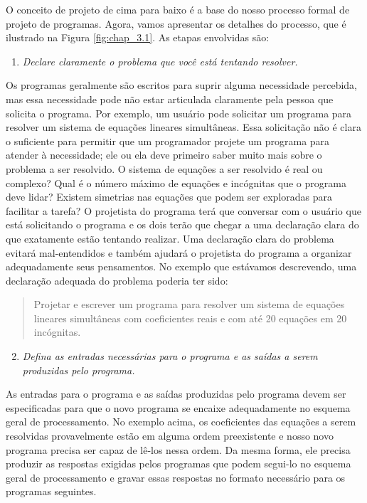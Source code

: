 \documentclass[11pt,a4paper]{book}
\begin{document}
	
	O conceito de projeto de cima para baixo é a base do nosso processo formal de projeto de programas. Agora, vamos apresentar os detalhes do processo, que é ilustrado na Figura \ref{fig:chap_3.1}. As etapas envolvidas são:
	
	\begin{enumerate}
		\item \textit{Declare claramente o problema que você está tentando resolver.}
	\end{enumerate}
	
	Os programas geralmente são escritos para suprir alguma necessidade percebida, mas essa necessidade pode não estar articulada claramente pela pessoa que solicita o programa. Por exemplo, um usuário pode solicitar um programa para resolver um sistema de equações lineares simultâneas. Essa solicitação não é clara o suficiente para permitir que um programador projete um programa para atender à necessidade; ele ou ela deve primeiro saber muito mais sobre o problema a ser resolvido. O sistema de equações a ser resolvido é real ou complexo? Qual é o número máximo de equações e incógnitas que o programa deve lidar? Existem simetrias nas equações que podem ser exploradas para facilitar a tarefa? O projetista do programa terá que conversar com o usuário que está solicitando o programa e os dois terão que chegar a uma declaração clara do que exatamente estão tentando realizar. Uma declaração clara do problema evitará mal-entendidos e também ajudará o projetista do programa a organizar adequadamente seus pensamentos. No exemplo que estávamos descrevendo, uma declaração adequada do problema poderia ter sido:
	
	\begin{quotation}
		Projetar e escrever um programa para resolver um sistema de equações lineares simultâneas com coeficientes reais e com até 20 equações em 20 incógnitas.
	\end{quotation}
	
	\begin{enumerate}
		\setcounter{enumi}{1} %
		\item \textit{Defina as entradas necessárias para o programa e as saídas a serem produzidas pelo programa.}
	\end{enumerate}
	
	As entradas para o programa e as saídas produzidas pelo programa devem ser especificadas para que o novo programa se encaixe adequadamente no esquema geral de processamento. No exemplo acima, os coeficientes das equações a serem resolvidas provavelmente estão em alguma ordem preexistente e nosso novo programa precisa ser capaz de lê-los nessa ordem. Da mesma forma, ele precisa produzir as respostas exigidas pelos programas que podem segui-lo no esquema geral de processamento e gravar essas respostas no formato necessário para os programas seguintes.
	
\end{document}
